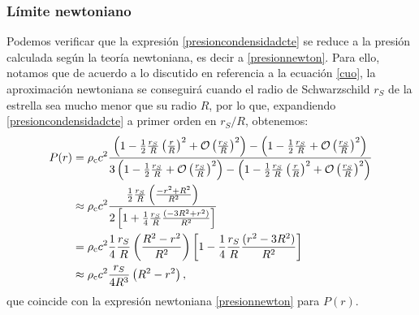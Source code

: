 \subsubsection{Límite newtoniano}
Podemos verificar que la expresión \eqref{presioncondensidadcte} se reduce a la presión calculada según la teoría newtoniana, es decir a \eqref{presionnewton}. Para ello, notamos que de acuerdo a lo discutido en referencia a la ecuación \eqref{cuo}, la aproximación newtoniana se conseguirá cuando el radio de Schwarzschild $r_S$ de la estrella sea mucho menor que su radio $R$, por lo que, expandiendo \eqref{presioncondensidadcte} a primer orden en $r_S/R$, obtenemos:
\begin{align}
 P(r)&=\rho_{\rm c} c^2\frac{\left(1-\frac{1}{2}\frac{r_S}{R}\left(\frac{r}{R}\right)^2+\mathcal{O}\left(\frac{r_S}{R}\right)^2\right)-\left(1-\frac{1}{2}\frac{r_S}{R}+\mathcal{O}\left(\frac{r_S}{R}\right)^2\right)}{3\left(1-\frac{1}{2}\frac{r_S}{R}+\mathcal{O}\left(\frac{r_S}{R}\right)^2\right)-\left(1-\frac{1}{2}\frac{r_S}{R}\left(\frac{r}{R}\right)^2+\mathcal{O}\left(\frac{r_S}{R}\right)^2\right)}\\
&\approx\rho_{\rm c} c^2\frac{\frac{1}{2}\frac{r_S}{R}\left(\frac{-r^2+R^2}{R^2}\right)}{2\left[1+\frac{1}{4}\frac{r_S}{R}\frac{(-3R^2+r^2)}{R^2}\right]}\\
&=\rho_{\rm c} c^2\frac{1}{4}\frac{r_S}{R}\left(\frac{R^2-r^2}{R^2}\right)\left[1-\frac{1}{4}\frac{r_S}{R}\frac{(r^2-3R^2)}{R^2}\right]\\
&\approx\rho_{\rm c} c^2\frac{r_S}{4R^3}\left(R^2-r^2\right),
\end{align}
que coincide con la expresión newtoniana \eqref{presionnewton} para $P(r)$.

